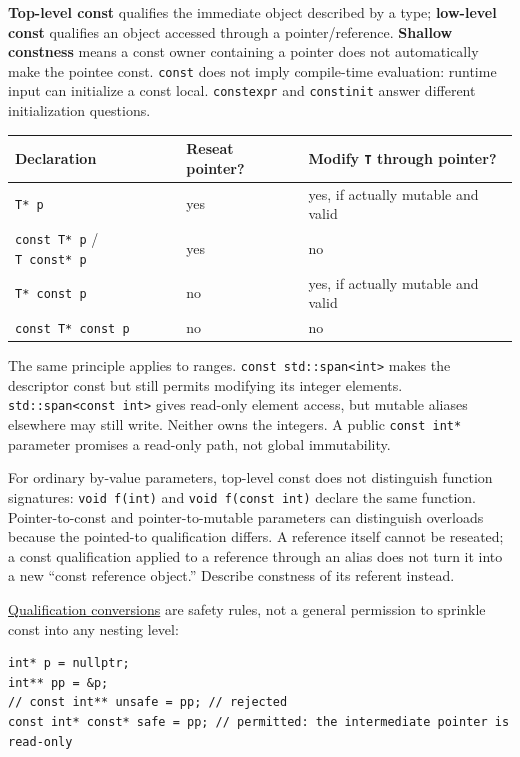 \textbf{Top-level const} qualifies the immediate object described by a type; \textbf{low-level const} qualifies an object accessed through a pointer/reference. \textbf{Shallow constness} means a const owner containing a pointer does not automatically make the pointee const. \texttt{const} does not imply compile-time evaluation: runtime input can initialize a const local. \texttt{constexpr} and \texttt{constinit} answer different initialization questions.

{\def\LTcaptype{none} %
\begin{longtable}[]{@{}lll@{}}
\toprule\noalign{}
Declaration & Reseat pointer? & Modify \texttt{T} through pointer? \\
\midrule\noalign{}
\endhead
\bottomrule\noalign{}
\endlastfoot
\texttt{T*\ p} & yes & yes, if actually mutable and valid \\
\texttt{const\ T*\ p} / \texttt{T\ const*\ p} & yes & no \\
\texttt{T*\ const\ p} & no & yes, if actually mutable and valid \\
\texttt{const\ T*\ const\ p} & no & no \\
\end{longtable}
}

The same principle applies to ranges. \texttt{const\ std::span\textless{}int\textgreater{}} makes the descriptor const but still permits modifying its integer elements. \texttt{std::span\textless{}const\ int\textgreater{}} gives read-only element access, but mutable aliases elsewhere may still write. Neither owns the integers. A public \texttt{const\ int*} parameter promises a read-only path, not global immutability.

For ordinary by-value parameters, top-level const does not distinguish function signatures: \texttt{void\ f(int)} and \texttt{void\ f(const\ int)} declare the same function. Pointer-to-const and pointer-to-mutable parameters can distinguish overloads because the pointed-to qualification differs. A reference itself cannot be reseated; a const qualification applied to a reference through an alias does not turn it into a new ``const reference object.'' Describe constness of its referent instead.

\hyperref[appendix-5e1a7561cd98]{Qualification conversions} are safety rules, not a general permission to sprinkle const into any nesting level:

\begin{verbatim}
int* p = nullptr;
int** pp = &p;
// const int** unsafe = pp; // rejected
const int* const* safe = pp; // permitted: the intermediate pointer is read-only
\end{verbatim}

